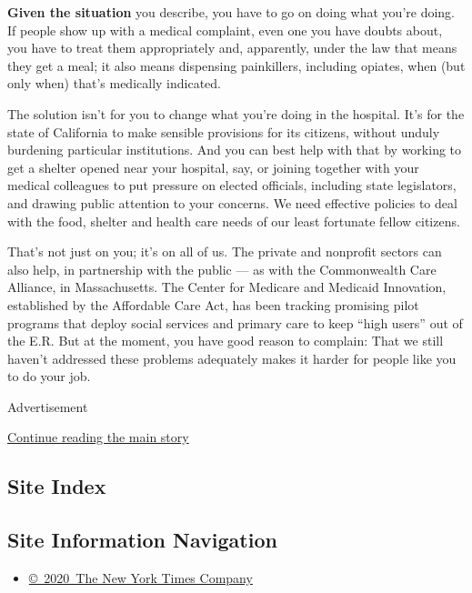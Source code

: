 \textbf{Given the situation} you describe, you have to go on doing what
you're doing. If people show up with a medical complaint, even one you
have doubts about, you have to treat them appropriately and, apparently,
under the law that means they get a meal; it also means dispensing
painkillers, including opiates, when (but only when) that's medically
indicated.

The solution isn't for you to change what you're doing in the hospital.
It's for the state of California to make sensible provisions for its
citizens, without unduly burdening particular institutions. And you can
best help with that by working to get a shelter opened near your
hospital, say, or joining together with your medical colleagues to put
pressure on elected officials, including state legislators, and drawing
public attention to your concerns. We need effective policies to deal
with the food, shelter and health care needs of our least fortunate
fellow citizens.

That's not just on you; it's on all of us. The private and nonprofit
sectors can also help, in partnership with the public --- as with the
Commonwealth Care Alliance, in Massachusetts. The Center for Medicare
and Medicaid Innovation, established by the Affordable Care Act, has
been tracking promising pilot programs that deploy social services and
primary care to keep ``high users'' out of the E.R. But at the moment,
you have good reason to complain: That we still haven't addressed these
problems adequately makes it harder for people like you to do your job.

Advertisement

\protect\hyperlink{after-bottom}{Continue reading the main story}

\hypertarget{site-index}{%
\subsection{Site Index}\label{site-index}}

\hypertarget{site-information-navigation}{%
\subsection{Site Information
Navigation}\label{site-information-navigation}}

\begin{itemize}
\tightlist
\item
  \href{https://help.nytimes3xbfgragh.onion/hc/en-us/articles/115014792127-Copyright-notice}{©~2020~The
  New York Times Company}
\end{itemize}

